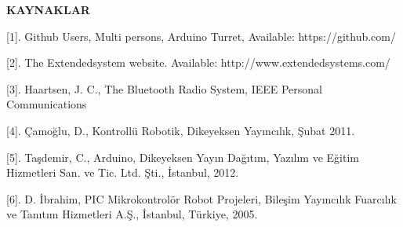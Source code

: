 \textbf{KAYNAKLAR}
\label{CH:BolumKaynakca}

[1]. Github Users, Multi persons, Arduino Turret, Available: https://github.com/

[2]. The Extendedsystem website. Available: http://www.extendedsystems.com/

[3]. Haartsen, J. C., The Bluetooth Radio System, IEEE Personal Communications 

[4]. Çamoğlu, D., Kontrollü Robotik, Dikeyeksen Yayıncılık, Şubat 2011. 

[5]. Taşdemir, C., Arduino, Dikeyeksen Yayın Dağıtım, Yazılım ve Eğitim Hizmetleri San. ve Tic. Ltd. Şti., İstanbul, 2012. 

[6]. D. İbrahim, PIC Mikrokontrolör Robot Projeleri, Bileşim Yayıncılık Fuarcılık ve Tanıtım Hizmetleri A.Ş., İstanbul, Türkiye, 2005.

\clearpage
